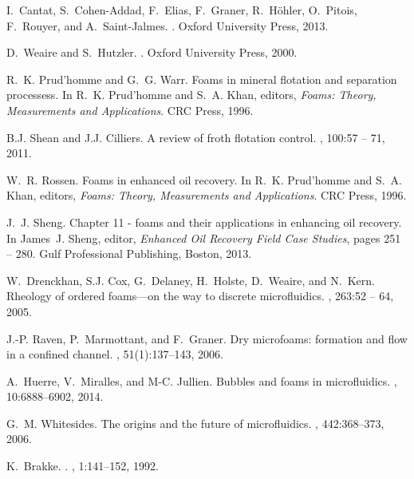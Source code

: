 \documentclass[preprint]{revtex4-1}
\begin{document}
\begin{thebibliography}{10}

I.~Cantat, S.~Cohen-Addad, F.~Elias, F.~Graner, R.~H\"{o}hler, O.~Pitois,
  F.~Rouyer, and A.~Saint-Jalmes.
.
\newblock Oxford University Press, 2013.

D.~Weaire and S.~Hutzler.
.
\newblock Oxford University Press, 2000.

R.~K. Prud'homme and G.~G. Warr.
\newblock Foams in mineral flotation and separation processess.
\newblock In R.~K. Prud'homme and S.~A. Khan, editors, {\em Foams: Theory,
  Measurements and Applications}. CRC Press, 1996.

B.J. Shean and J.J. Cilliers.
\newblock A review of froth flotation control.
, 100:57 -- 71,
  2011.

W.~R. Rossen.
\newblock Foams in enhanced oil recovery.
\newblock In R.~K. Prud'homme and S.~A. Khan, editors, {\em Foams: Theory,
  Measurements and Applications}. CRC Press, 1996.

J.~J. Sheng.
\newblock Chapter 11 - foams and their applications in enhancing oil recovery.
\newblock In James~J. Sheng, editor, {\em Enhanced Oil Recovery Field Case
  Studies}, pages 251 -- 280. Gulf Professional Publishing, Boston, 2013.

W.~Drenckhan, S.J. Cox, G.~Delaney, H.~Holste, D.~Weaire, and N.~Kern.
\newblock Rheology of ordered foams—on the way to discrete microfluidics.
, 263:52 -- 64, 2005.

J.-P. Raven, P.~Marmottant, and F.~Graner.
\newblock Dry microfoams: formation and flow in a confined channel.
, 51(1):137--143, 2006.

A.~Huerre, V.~Miralles, and M-C. Jullien.
\newblock Bubbles and foams in microfluidics.
, 10:6888--6902, 2014.

G.~M. Whitesides.
\newblock The origins and the future of microfluidics.
, 442:368--373, 2006.

K.~Brakke.
.
, 1:141--152, 1992.


\end{thebibliography}
\end{document}

